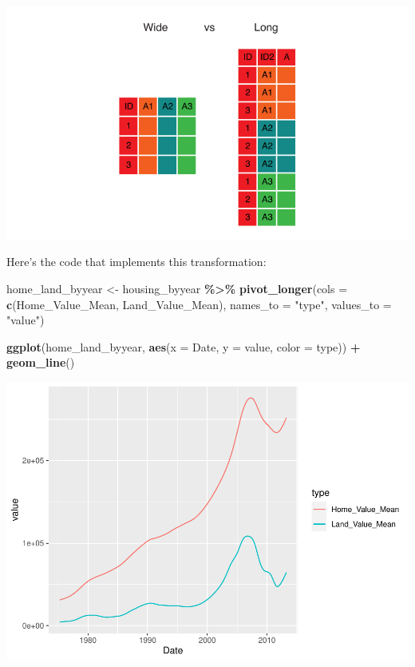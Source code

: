 \documentclass[
]{book}
\newenvironment{Shaded}{\begin{snugshade}}{\end{snugshade}}
\newcommand{\DataTypeTok}[1]{\textcolor[rgb]{0.13,0.29,0.53}{#1}}
\newcommand{\KeywordTok}[1]{\textcolor[rgb]{0.13,0.29,0.53}{\textbf{#1}}}
\newcommand{\NormalTok}[1]{#1}
\newcommand{\OperatorTok}[1]{\textcolor[rgb]{0.81,0.36,0.00}{\textbf{#1}}}
\newcommand{\StringTok}[1]{\textcolor[rgb]{0.31,0.60,0.02}{#1}}
\begin{document}
\includegraphics{R/Rgraphics/images/wide_vs_long.png}

Here's the code that implements this transformation:

\begin{Shaded}
\begin{Highlighting}[]
\NormalTok{home\_land\_byyear \textless{}{-}}\StringTok{ }
\StringTok{    }\NormalTok{housing\_byyear }\OperatorTok{\%\textgreater{}\%}
\StringTok{    }\KeywordTok{pivot\_longer}\NormalTok{(}\DataTypeTok{cols =} \KeywordTok{c}\NormalTok{(Home\_Value\_Mean, Land\_Value\_Mean),}
                 \DataTypeTok{names\_to =} \StringTok{"type"}\NormalTok{,}
                 \DataTypeTok{values\_to =} \StringTok{"value"}\NormalTok{)}
                          
\KeywordTok{ggplot}\NormalTok{(home\_land\_byyear, }\KeywordTok{aes}\NormalTok{(}\DataTypeTok{x =}\NormalTok{ Date, }\DataTypeTok{y =}\NormalTok{ value, }\DataTypeTok{color =}\NormalTok{ type)) }\OperatorTok{+}
\StringTok{  }\KeywordTok{geom\_line}\NormalTok{()}
\end{Highlighting}
\end{Shaded}

\includegraphics{R/Rgraphics/figures/unnamed-chunk-214-1.pdf}
\end{document}
